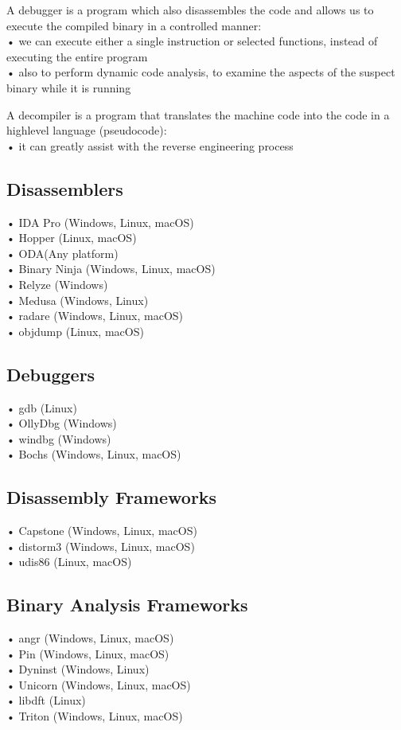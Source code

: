 \documentclass[]{project_plan}
\begin{document}
A debugger is a program which also disassembles the code and allows us to
execute the compiled binary in a controlled manner:\\
• we can execute either a single instruction or selected functions, instead of
executing the entire program\\
• also to perform dynamic code analysis, to examine the aspects of the suspect binary
while it is running

A decompiler is a program that translates the machine code into the code in a highlevel language (pseudocode):\\
• it can greatly assist with the reverse engineering process

\subsection{Disassemblers}
• IDA Pro (Windows, Linux, macOS)\\
• Hopper (Linux, macOS)\\
• ODA(Any platform)\\
• Binary Ninja (Windows, Linux, macOS)\\
• Relyze (Windows)\\
• Medusa (Windows, Linux)\\
• radare (Windows, Linux, macOS)\\
• objdump (Linux, macOS)

\subsection{Debuggers}
• gdb (Linux)\\
• OllyDbg (Windows)\\
• windbg (Windows)\\
• Bochs (Windows, Linux, macOS)

\subsection{Disassembly Frameworks}
• Capstone (Windows, Linux, macOS)\\
• distorm3 (Windows, Linux, macOS)\\
• udis86 (Linux, macOS)

\subsection{Binary Analysis Frameworks}
• angr (Windows, Linux, macOS)\\
• Pin (Windows, Linux, macOS)\\
• Dyninst (Windows, Linux)\\
• Unicorn (Windows, Linux, macOS)\\
• libdft (Linux)\\
• Triton (Windows, Linux, macOS)
\end{document}

